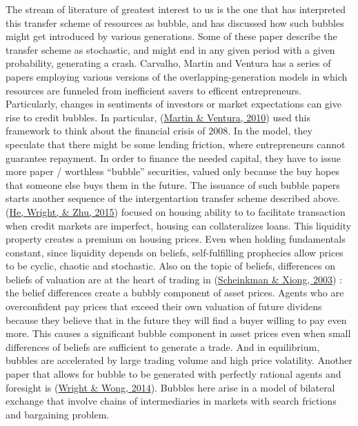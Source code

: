\documentclass[
  12pt,
]{article}
\begin{document}
The stream of literature of greatest interest to us is the one that has interpreted this transfer scheme of resources as bubble, and has discussed how such bubbles might get introduced by various generations. Some of these paper describe the transfer scheme as stochastic, and might end in any given period with a given probability, generating a crash. Carvalho, Martin and Ventura has a series of papers employing various versions of the overlapping-generation models in which resources are funneled from inefficient savers to efficent entrepreneurs. Particularly, changes in sentiments of investors or market expectations can give rise to credit bubbles. In particular, (\protect\hyperlink{ref-martin_theoretical_2010}{Martin \& Ventura, 2010}) used this framework to think about the financial crisis of 2008. In the model, they speculate that there might be some lending friction, where entrepreneurs cannot guarantee repayment. In order to finance the needed capital, they have to issue more paper / worthless ``bubble'' securities, valued only because the buy hopes that someone else buys them in the future. The issuance of such bubble papers starts another sequence of the intergentartion transfer scheme described above. (\protect\hyperlink{ref-he_housing_2015}{He, Wright, \& Zhu, 2015}) focused on housing ability to to facilitate transaction when credit markets are imperfect, housing can collateralizes loans. This liquidity property creates a premium on housing prices. Even when holding fundamentals constant, since liquidity depends on beliefs, self-fulfilling prophecies allow prices to be cyclic, chaotic and stochastic. Also on the topic of beliefs, differences on beliefs of valuation are at the heart of trading in (\protect\hyperlink{ref-scheinkman_overconfidence_2003}{Scheinkman \& Xiong, 2003}) : the belief differences create a bubbly component of asset prices. Agents who are overconfident pay prices that exceed their own valuation of future dividens because they believe that in the future they will find a buyer willing to pay even more. This causes a significant bubble component in asset prices even when small differences of beliefs are sufficient to generate a trade. And in equilibrium, bubbles are accelerated by large trading volume and high price volatility. Another paper that allows for bubble to be generated with perfectly rational agents and foresight is (\protect\hyperlink{ref-wright_buyers_2014}{Wright \& Wong, 2014}). Bubbles here arise in a model of bilateral exchange that involve chains of intermediaries in markets with search frictions and bargaining problem.
\end{document}
